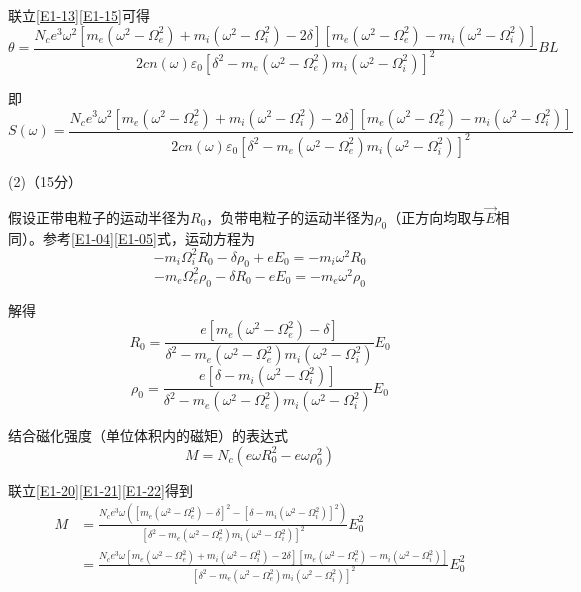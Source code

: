 \documentclass[10pt,a4paper,onecolumn,UTF8]{ctexart}
\begin{document}
	联立\eqref{E1-13}\eqref{E1-15}可得
	\begin{equation}
		\theta=\frac{N_ce^3\omega^2\left[m_e(\omega^2-\Omega_e^2)+m_i(\omega^2-\Omega_i^2)-2\delta\right]\left[m_e(\omega^2-\Omega_e^2)-m_i(\omega^2-\Omega_i^2)\right]}{2cn(\omega)\varepsilon_0\left[\delta^2-m_e(\omega^2-\Omega_e^2)m_i(\omega^2-\Omega_i^2)\right]^2}BL
	\end{equation}
	
	即
	\begin{equation}\label{E1-17}
		S(\omega)=\frac{N_ce^3\omega^2\left[m_e(\omega^2-\Omega_e^2)+m_i(\omega^2-\Omega_i^2)-2\delta\right]\left[m_e(\omega^2-\Omega_e^2)-m_i(\omega^2-\Omega_i^2)\right]}{2cn(\omega)\varepsilon_0\left[\delta^2-m_e(\omega^2-\Omega_e^2)m_i(\omega^2-\Omega_i^2)\right]^2}
	\end{equation}
	
	(2)（15分）
	
	假设正带电粒子的运动半径为$R_0$，负带电粒子的运动半径为$\rho_0$（正方向均取与$\vec E$相同）。参考\eqref{E1-04}\eqref{E1-05}式，运动方程为
	\begin{equation}
		-m_i\Omega_i^2 R_0-\delta\rho_0+e E_0=-m_i\omega^2R_0
	\end{equation}
	\begin{equation}
		-m_e\Omega_e^2\rho_0-\delta R_0-e E_0=-m_e\omega^2\rho_0
	\end{equation}
	
	解得
	\begin{equation}\label{E1-20}
		R_0=\frac{e\left[m_e(\omega^2-\Omega_e^2)-\delta\right]}{\delta^2-m_e(\omega^2-\Omega_e^2)m_i(\omega^2-\Omega_i^2)}E_0
	\end{equation}
	\begin{equation}\label{E1-21}
		\rho_0=\frac{e\left[\delta-m_i(\omega^2-\Omega_i^2)\right]}{\delta^2-m_e(\omega^2-\Omega_e^2)m_i(\omega^2-\Omega_i^2)}E_0
	\end{equation}
	
	结合磁化强度（单位体积内的磁矩）的表达式
	\begin{equation}\label{E1-22}
		M=N_c(e\omega R_0^2-e\omega\rho_0^2)
	\end{equation}
	
	联立\eqref{E1-20}\eqref{E1-21}\eqref{E1-22}得到
	\begin{equation}
		\begin{aligned}
			M&=\frac{N_ce^3\omega\left(\left[m_e(\omega^2-\Omega_e^2)-\delta\right]^2-\left[\delta-m_i(\omega^2-\Omega_i^2)\right]^2\right)}{\left[\delta^2-m_e(\omega^2-\Omega_e^2)m_i(\omega^2-\Omega_i^2)\right]^2}E_0^2\\
			&=\frac{N_ce^3\omega\left[m_e(\omega^2-\Omega_e^2)+m_i(\omega^2-\Omega_i^2)-2\delta\right]\left[m_e(\omega^2-\Omega_e^2)-m_i(\omega^2-\Omega_i^2)\right]}{\left[\delta^2-m_e(\omega^2-\Omega_e^2)m_i(\omega^2-\Omega_i^2)\right]^2}E_0^2
		\end{aligned}
	\end{equation}
	
\end{document}
